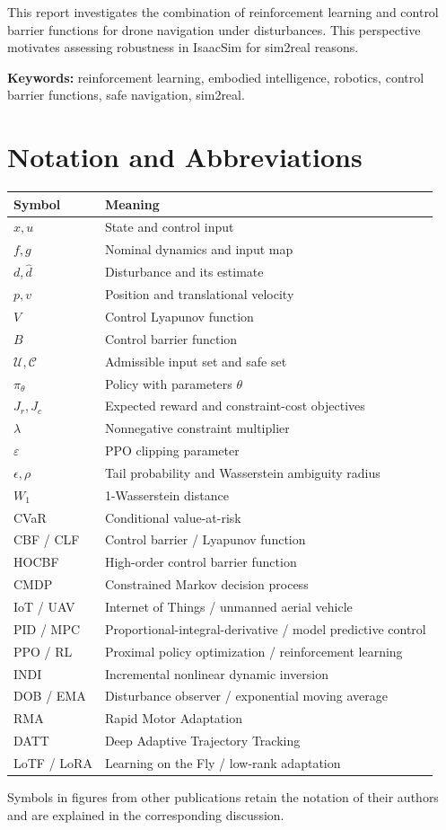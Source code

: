 This report investigates the combination of reinforcement learning and control barrier functions for drone navigation under disturbances. This perspective motivates assessing robustness in IsaacSim for sim2real reasons.

\noindent\textbf{Keywords:} reinforcement learning, embodied intelligence, robotics, control barrier functions, safe navigation, sim2real.

\clearpage{}\listoffigures
\clearpage{}\listoftables
\chapter*{Notation and Abbreviations}
\begin{longtable}{@{}p{}p{}@{}}
\toprule Symbol & Meaning\\\midrule\endhead
$x,u$ & State and control input\\
$f,g$ & Nominal dynamics and input map\\
$d,\hat d$ & Disturbance and its estimate\\
$p,v$ & Position and translational velocity\\
$V$ & Control Lyapunov function\\
$B$ & Control barrier function\\
$\mathcal U,\mathcal C$ & Admissible input set and safe set\\
$\pi_\theta$ & Policy with parameters $\theta$\\
$J_r,J_c$ & Expected reward and constraint-cost objectives\\
$\lambda$ & Nonnegative constraint multiplier\\
$\varepsilon$ & PPO clipping parameter\\
$\epsilon,\rho$ & Tail probability and Wasserstein ambiguity radius\\
$W_1$ & 1-Wasserstein distance\\
CVaR & Conditional value-at-risk\\
CBF / CLF & Control barrier / Lyapunov function\\
HOCBF & High-order control barrier function\\
CMDP & Constrained Markov decision process\\
IoT / UAV & Internet of Things / unmanned aerial vehicle\\
PID / MPC & Proportional-integral-derivative / model predictive control\\
PPO / RL & Proximal policy optimization / reinforcement learning\\
INDI & Incremental nonlinear dynamic inversion\\
DOB / EMA & Disturbance observer / exponential moving average\\
RMA & Rapid Motor Adaptation\\
DATT & Deep Adaptive Trajectory Tracking\\
LoTF / LoRA & Learning on the Fly / low-rank adaptation\\
\bottomrule
\end{longtable}
Symbols in figures from other publications retain the notation of their authors and are explained in the corresponding discussion.
